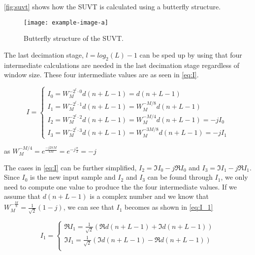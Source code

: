 \documentclass[../main.tex]{subfiles}
\begin{document}
\autoref{fig:suvt} shows how the SUVT is calculated using a butterfly structure.

\begin{figure}[ht]
    \centering
    \texttt{[image: example-image-a]}
    \caption{Butterfly structure of the SUVT.}
    \label{fig:suvt}
\end{figure}

The last decimation stage, $l = log_2(L) - 1$ can be sped up by using that four intermediate calculations are needed in the last decimation stage regardless of window size.
These four intermediate values are as seen in \eqref{eq:I}.

\begin{equation}
    \label{eq:I}
    I =
    \begin{cases}
        I_0 = W_{M}^{-2^{l} \cdot 0 } d(n + L - 1) = d(n + L - 1) \\
        I_1 = W_{M}^{-2^{l} \cdot 1 } d(n + L - 1) = W_{M}^{-M/8} d(n + L - 1) \\
        I_2 = W_{M}^{-2^{l} \cdot 2 } d(n + L - 1) = W_{M}^{-M/4} d(n + L - 1) = - j I_0 \\
        I_3 = W_{M}^{-2^{l} \cdot 3 } d(n + L - 1) = W_{M}^{-3M/8} d(n + L - 1) = -j I_1
    \end{cases}
\end{equation}

as $W_{M}^{-M/4} = e^{\frac{-j 2 \pi M}{4 M}} = e^{-j \frac{\pi}{ 2}} = -j$

The cases in \eqref{eq:I} can be further simplified, $I_2 = \Im{I_0} - j \Re{I_0}$ and $I_3 = \Im{I_1} - j \Re{I_1}$.
Since $I_0$ is the new input sample and $I_2$ and $I_3$ can be found through $I_1$, we only need to compute one value to produce the the four intermediate values.
If we assume that $d(n + L - 1)$ is a complex number and we know that $W_{M}^{-\frac{M}{8}} = \frac{1}{\sqrt{2}} (1 - j)$, we can see that $I_1$ becomes as shown in \eqref{eq:I_1}

\begin{equation}
    \label{eq:I_1}
    I_1 = 
    \begin{cases}
        \Re{I_1} = \frac{1}{\sqrt{2}} ( \Re{d(n + L - 1)} + \Im{d(n + L - 1)} ) \\
        \Im{I_1} = \frac{1}{\sqrt{2}} ( \Im{d(n + L - 1)} - \Re{d(n + L - 1)} ) \\
    \end{cases}
\end{equation}
\end{document}
